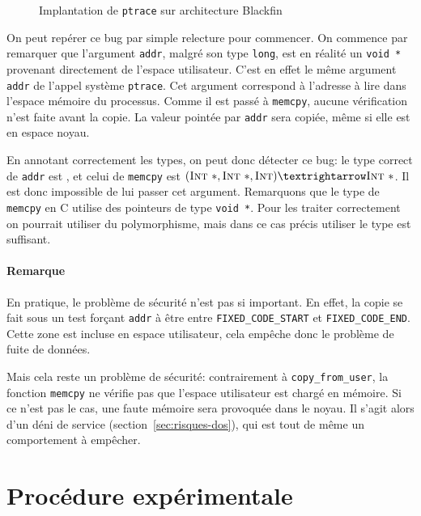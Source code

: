 \begin{figure}
    \caption{Implantation de \texttt{ptrace} sur architecture Blackfin}
    \label{fig:ptrace-blackfin}
\end{figure}


On peut repérer ce bug par simple relecture pour commencer. On commence par
remarquer que l'argument \texttt{addr}, malgré son type \texttt{long}, est en
réalité un \texttt{void *} provenant directement de l'espace utilisateur. C'est
en effet le même argument \texttt{addr} de l'appel système \texttt{ptrace}.
Cet argument correspond à l'adresse à lire dans l'espace mémoire du processus.
Comme il est passé à \texttt{memcpy}, aucune vérification n'est faite avant la
copie. La valeur pointée par \texttt{addr} sera copiée, même si elle est en
espace noyau.

En annotant correctement les types, on peut donc détecter ce bug: le type
correct de \texttt{addr} est \ptrU{\tInt}, et celui de \texttt{memcpy} est
$(\ptrK{\tInt}, \ptrK{\tInt}, \tInt) → \ptrK{\tInt}$. Il est donc impossible de
lui passer cet argument. Remarquons que le type de \texttt{memcpy} en C utilise
des pointeurs de type \texttt{void *}. Pour les traiter correctement on pourrait
utiliser du polymorphisme, mais dans ce cas précis utiliser le type \ptrK{\tInt}
est suffisant.

\paragraph{Remarque}

En pratique, le problème de sécurité n'est pas si important. En effet,
la copie se fait sous un test forçant \texttt{addr} à être entre
\nolinkurl{FIXED\_CODE\_START} et \texttt{FIXED\_CODE\_END}. Cette zone est
incluse en espace utilisateur, cela empêche donc le problème de fuite de
données.

Mais cela reste un problème de sécurité: contrairement à
\texttt{copy\_from\_user}, la fonction \texttt{memcpy} ne vérifie pas que
l'espace utilisateur est chargé en mémoire. Si ce n'est pas le cas, une faute
mémoire sera provoquée dans le noyau. Il s'agit alors d'un déni de service
(section~\ref{sec:risques-dos}), qui est tout de même un comportement à
empêcher.

\section{Procédure expérimentale}
\label{sec:demo-unif}

